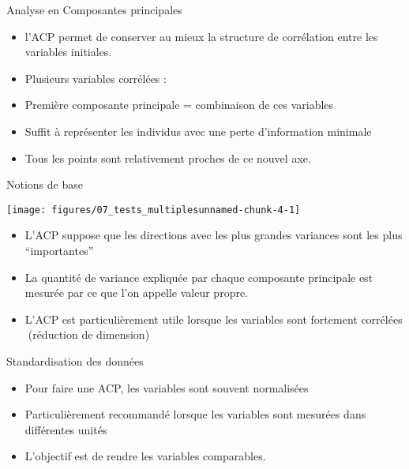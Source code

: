 \documentclass[ignorenonframetext,]{beamer}
\providecommand{\tightlist}{%
  \setlength{\itemsep}{0pt}\setlength{\parskip}{0pt}}
\begin{document}
\begin{frame}{Analyse en Composantes principales}

\begin{itemize}
\item
  l'ACP permet de conserver au mieux la structure de corrélation entre
  les variables initiales.
\item
  Plusieurs variables corrélées :
\item
  Première composante principale = combinaison de ces variables
\item
  Suffit à représenter les individus avec une perte d'information
  minimale
\item
  Tous les points sont relativement proches de ce nouvel axe.
\end{itemize}

\end{frame}

\begin{frame}{Notions de base}

\begin{center}\texttt{[image: figures/07\_tests\_multiplesunnamed-chunk-4-1]} \end{center}

\begin{itemize}
\tightlist
\item
  L'ACP suppose que les directions avec les plus grandes variances sont
  les plus ``importantes''
\item
  La quantité de variance expliquée par chaque composante principale est
  mesurée par ce que l'on appelle valeur propre.
\item
  L'ACP est particulièrement utile lorsque les variables sont fortement
  corrélées (réduction de dimension)
\end{itemize}

\end{frame}

\begin{frame}{Standardisation des données}

\begin{itemize}
\tightlist
\item
  Pour faire une ACP, les variables sont souvent normalisées
\item
  Particulièrement recommandé lorsque les variables sont mesurées dans
  différentes unités
\item
  L'objectif est de rendre les variables comparables.
\end{itemize}

\end{frame}
\end{document}

